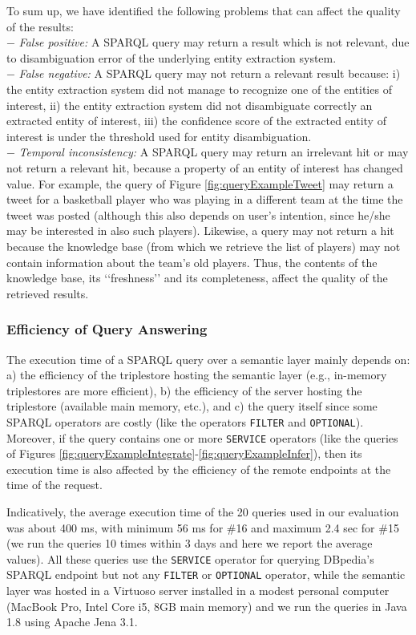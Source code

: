 \documentclass{libtex/sig-alternate-05-2015}
\newcommand{\q}[1]{\lq\lq{}{}#1\rq\rq{}{}}
\begin{document}
To sum up, we have identified the following problems
that can affect the quality of the results: \\
$-$ {\em False positive:} A SPARQL query may return a
result which is not relevant, due to disambiguation error
of the underlying entity extraction system.\\
$-$ {\em False negative:} A SPARQL query may not return a relevant result because:
i) the entity extraction system did not manage to recognize one of the entities of interest,
ii) the entity extraction system did not disambiguate correctly
an extracted entity of interest,
iii) the confidence score of the extracted entity of interest
is under the threshold used for entity disambiguation.\\
$-$ {\em Temporal inconsistency:}
A SPARQL query may return an irrelevant hit
or may not return a relevant hit,
because a property of an entity of interest has changed value.
For example,
the query of Figure \ref{fig:queryExampleTweet}
may return a tweet for a basketball player who was playing
in a different team at the time the tweet was posted
(although this also depends on user's intention, since
he/she may be interested in also such players).
Likewise, a query may not return a hit because
the knowledge base (from which we retrieve the list of players)
may not contain information about the team's old players.
Thus, the contents of the knowledge base, its \q{freshness}
and its completeness, affect the quality
of the retrieved results.



\subsubsection*{Efficiency of Query Answering}
The execution time of a SPARQL query over a semantic layer mainly depends on:
a) the efficiency of the triplestore hosting the semantic layer
   (e.g., in-memory triplestores are more efficient),
b) the efficiency of the server hosting the triplestore (available main memory, etc.), and
c) the query itself since some SPARQL operators are costly (like the operators {\tt FILTER}
and {\tt OPTIONAL}). Moreover, if the query contains
one or more {\tt SERVICE} operators (like the queries of
Figures \ref{fig:queryExampleIntegrate}-\ref{fig:queryExampleInfer}),
then its execution time is also affected by the efficiency of
the remote endpoints at the time of the request.

Indicatively,
the average execution time of
the 20 queries used in our evaluation
was about 400 ms, with minimum 56 ms for \#16 and maximum 2.4 sec for \#15
(we run the queries 10 times within 3 days and here we report the average values).
All these queries use the {\tt SERVICE} operator for
querying DBpedia's SPARQL endpoint but not any {\tt FILTER} or {\tt OPTIONAL} operator,
while the semantic layer was hosted in a Virtuoso server installed
in a modest personal computer (MacBook Pro, Intel Core i5, 8GB main memory)
and we run the queries in Java 1.8 using Apache Jena 3.1.
\end{document}
